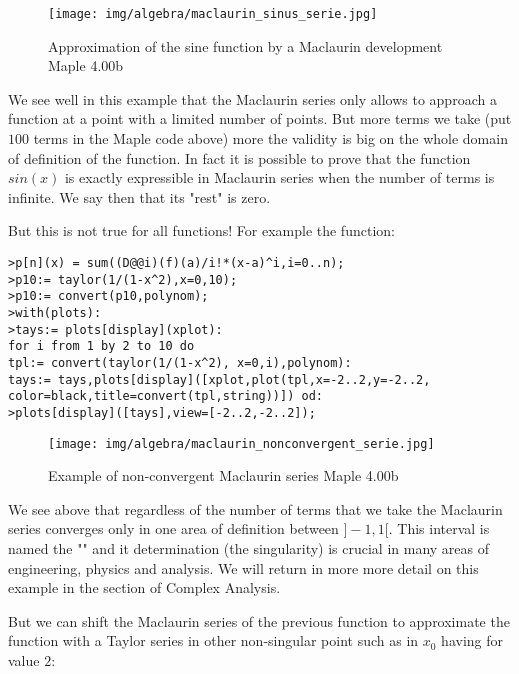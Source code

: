 	\begin{figure}[H]
		\centering
		\texttt{[image: img/algebra/maclaurin\_sinus\_serie.jpg]}
		\caption{Approximation of the sine function by a Maclaurin development Maple 4.00b}
	\end{figure}
	We see well in this example that the Maclaurin series only allows to approach a function at a point with a limited number of points. But more terms we take (put $100$ terms in the Maple code above) more the validity is big on the whole domain of definition of the function. In fact it is possible to prove that the function $sin (x)$ is exactly expressible in Maclaurin series when the number of terms is infinite. We say then that its "rest" is zero.
	
	But this is not true for all functions! For example the function:
	
	
	\texttt{>p[n](x) = sum((D@@i)(f)(a)/i!*(x-a)\string^i,i=0..n); \\
	>p10:= taylor(1/(1-x\string^2),x=0,10);\\
	>p10:= convert(p10,polynom);\\
	>with(plots):\\
	>tays:= plots[display](xplot):\\
	for i from 1 by 2 to 10 do\\
	tpl:= convert(taylor(1/(1-x\string^2), x=0,i),polynom):\\
	tays:= tays,plots[display]([xplot,plot(tpl,x=-2..2,y=-2..2,
	color=black,title=convert(tpl,string))]) od: \\
	>plots[display]([tays],view=[-2..2,-2..2]);}
	\begin{figure}[H]
		\centering
		\texttt{[image: img/algebra/maclaurin\_nonconvergent\_serie.jpg]}
		\caption{Example of non-convergent Maclaurin series Maple 4.00b}
	\end{figure}
	We see above that regardless of the number of terms that we take the Maclaurin series converges only in one area of definition between $] -1,1 [$. This interval is named the "" and it determination (the singularity) is crucial in many areas of engineering, physics and analysis. We will return in more more detail on this example in the section of Complex Analysis.
	
	But we can shift the Maclaurin series of the previous function to approximate the function with a Taylor series in other non-singular point such as in $x_0$ having for value $2$:
	
